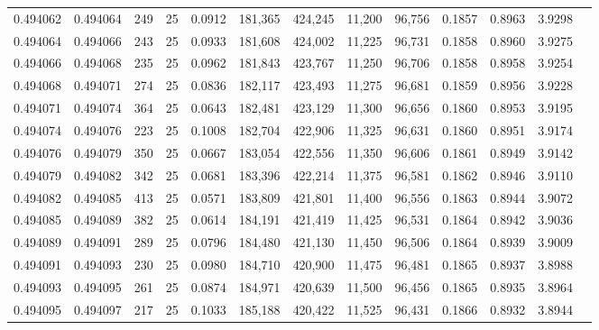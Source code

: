 \begin{tabular}{rrrrrrrrrrrrr}
0.494062 & 0.494064 &   249 &  25 &                                     0.0912 & 181,365 & 424,245 &  11,200 &  96,756 & 0.1857 & 0.8963 & 3.9298 \\
0.494064 & 0.494066 &   243 &  25 &                                     0.0933 & 181,608 & 424,002 &  11,225 &  96,731 & 0.1858 & 0.8960 & 3.9275 \\
0.494066 & 0.494068 &   235 &  25 &                                     0.0962 & 181,843 & 423,767 &  11,250 &  96,706 & 0.1858 & 0.8958 & 3.9254 \\
0.494068 & 0.494071 &   274 &  25 &                                     0.0836 & 182,117 & 423,493 &  11,275 &  96,681 & 0.1859 & 0.8956 & 3.9228 \\
0.494071 & 0.494074 &   364 &  25 &                                     0.0643 & 182,481 & 423,129 &  11,300 &  96,656 & 0.1860 & 0.8953 & 3.9195 \\
0.494074 & 0.494076 &   223 &  25 &                                     0.1008 & 182,704 & 422,906 &  11,325 &  96,631 & 0.1860 & 0.8951 & 3.9174 \\
0.494076 & 0.494079 &   350 &  25 &                                     0.0667 & 183,054 & 422,556 &  11,350 &  96,606 & 0.1861 & 0.8949 & 3.9142 \\
0.494079 & 0.494082 &   342 &  25 &                                     0.0681 & 183,396 & 422,214 &  11,375 &  96,581 & 0.1862 & 0.8946 & 3.9110 \\
0.494082 & 0.494085 &   413 &  25 &                                     0.0571 & 183,809 & 421,801 &  11,400 &  96,556 & 0.1863 & 0.8944 & 3.9072 \\
0.494085 & 0.494089 &   382 &  25 &                                     0.0614 & 184,191 & 421,419 &  11,425 &  96,531 & 0.1864 & 0.8942 & 3.9036 \\
0.494089 & 0.494091 &   289 &  25 &                                     0.0796 & 184,480 & 421,130 &  11,450 &  96,506 & 0.1864 & 0.8939 & 3.9009 \\
0.494091 & 0.494093 &   230 &  25 &                                     0.0980 & 184,710 & 420,900 &  11,475 &  96,481 & 0.1865 & 0.8937 & 3.8988 \\
0.494093 & 0.494095 &   261 &  25 &                                     0.0874 & 184,971 & 420,639 &  11,500 &  96,456 & 0.1865 & 0.8935 & 3.8964 \\
0.494095 & 0.494097 &   217 &  25 &                                     0.1033 & 185,188 & 420,422 &  11,525 &  96,431 & 0.1866 & 0.8932 & 3.8944 \\

\end{tabular}
